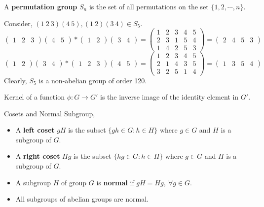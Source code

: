 \begin{definition}
	A \textbf{permutation group} $S_n$ is the set of all permutations on the set $\{1,2,\cdots,n\}$.	
\end{definition}

\begin{remark}
	Consider, $(1\ 2\ 3)(4\ 5), (1\ 2)(3\ 4) \in S_5$.
	$$\begin{pmatrix} 1 & 2 & 3 \end{pmatrix} \begin{pmatrix} 4 & 5 \end{pmatrix} \ast \begin{pmatrix} 1 & 2 \end{pmatrix} \begin{pmatrix} 3 & 4 \end{pmatrix} =  \begin{pmatrix} 1 & 2 & 3 & 4 & 5 \\ 2 & 3 & 1 & 5 & 4 \\ 1 & 4 & 2 & 5 & 3 \end{pmatrix}  = \begin{pmatrix} 2 & 4 & 5 & 3 \end{pmatrix} $$
	$$\begin{pmatrix} 1 & 2 \end{pmatrix} \begin{pmatrix} 3 & 4 \end{pmatrix} \ast \begin{pmatrix} 1 & 2 & 3\end{pmatrix} \begin{pmatrix} 4 & 5 \end{pmatrix} =  \begin{pmatrix} 1 & 2 & 3 & 4 & 5 \\ 2 & 1 & 4 & 3 & 5 \\ 3 & 2 & 5 & 1 & 4 \end{pmatrix}  = \begin{pmatrix} 1 & 3 & 5 & 4 \end{pmatrix} $$
	Clearly, $S_5$ is a non-abelian group of order 120.
\end{remark}

\begin{definition}
	Kernel of a function $\phi : G \to G'$ is the inverse image of the identity element in $G'$.%
\end{definition}

\begin{definition}Cosets and Normal Subgroup,
	\begin{itemize}
		\item A \textbf{left coset} $gH$ is the subset $\{ gh \in G : h \in H \}$ where $g \in G$ and  $H$ is a subgroup of $G$.%
		\item A \textbf{right coset} $Hg$ is the subset $\{ hg \in G : h \in H \}$ where $g \in G$ and  $H$ is a subgroup of $G$.%
		\item A subgroup $H$ of group $G$ is \textbf{normal} if $gH = Hg,\ \forall g \in G$.
		\item All subgroups of abelian groups are normal.
	\end{itemize}
\end{definition}

